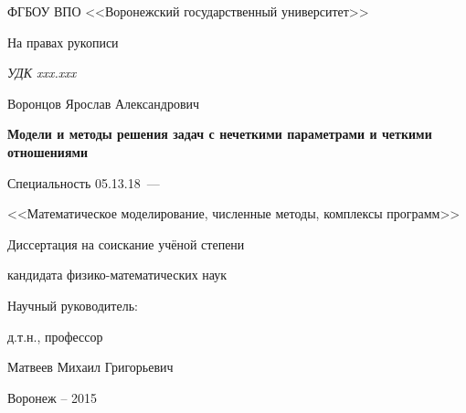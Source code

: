 \thispagestyle{empty}

\begin{center}
ФГБОУ ВПО <<Воронежский государственный университет>>\par
\par 
\par
\end{center}

\vspace{15mm}
\begin{flushright}
На правах рукописи

{\sl УДК xxx.xxx}
\end{flushright}

\vspace{20mm}
\begin{center}
{\large Воронцов Ярослав Александрович}
\end{center}

\vspace{5mm}
\begin{center}
{\bf \large Модели и методы решения задач с нечеткими параметрами и четкими отношениями
\par}

\vspace{10mm}
{%
Специальность 05.13.18~---

<<Математическое моделирование, численные методы, комплексы программ>>
}

\vspace{10mm}
Диссертация на соискание учёной степени

кандидата физико-математических наук
\end{center}

\vspace{20mm}
\begin{flushright}
Научный руководитель:

д.т.н., профессор

Матвеев Михаил Григорьевич

\end{flushright}

\vspace{20mm}
\begin{center}
{Воронеж -- 2015}
\end{center}

\newpage